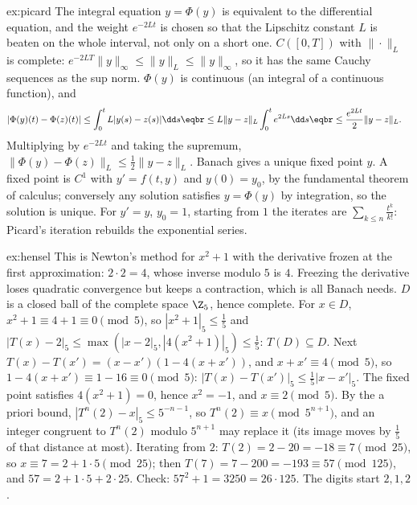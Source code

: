 \begin{solution}{ex:picard}
\idea The integral equation $y=\Phi(y)$ is equivalent to the differential equation, and the weight $e^{-2Lt}$ is chosen so that the
Lipschitz constant $L$ is beaten on the whole interval, not only on a short one.
\writeup $C([0,T])$ with $\|\cdot\|_L$ is complete: $e^{-2LT}\|y\|_\infty\le\|y\|_L\le\|y\|_\infty$, so it has the same Cauchy sequences as the sup norm. $\Phi(y)$ is
continuous (an integral of a continuous function), and
\[
\begin{aligned}|\Phi(y)(t)-\Phi(z)(t)|&\le\int_0^tL|y(s)-z(s)|\dd s\eqbr\le L\|y-z\|_L\int_0^te^{2Ls}\dd s\eqbr\le\frac{e^{2Lt}}2\|y-z\|_L.\end{aligned}
\]
Multiplying by $e^{-2Lt}$ and taking the supremum, $\|\Phi(y)-\Phi(z)\|_L\le\frac12\|y-z\|_L$. Banach gives a unique fixed point $y$. A fixed point is $C^1$ with
$y'=f(t,y)$ and $y(0)=y_0$, by the fundamental theorem of calculus; conversely any solution satisfies $y=\Phi(y)$ by integration, so the
solution is unique. For $y'=y$, $y_0=1$, starting from $1$ the iterates are $\sum_{k\le n}\frac{t^k}{k!}$: Picard's iteration rebuilds the exponential
series.
\end{solution}

\begin{solution}{ex:hensel}
\idea This is Newton's method for $x^2+1$ with the derivative frozen at the first approximation: $2\cdot2=4$, whose inverse modulo $5$ is $4$.
Freezing the derivative loses quadratic convergence but keeps a contraction, which is all Banach needs.
\writeup $D$ is a closed ball of the complete space $\Z_5$, hence complete. For $x\in D$, $x^2+1\equiv4+1\equiv0\pmod5$, so $|x^2+1|_5\le\frac15$ and $|T(x)-2|_5\le\max(|x-2|_5,|4(x^2+1)|_5)\le\frac15$:
$T(D)\subseteq D$. Next $T(x)-T(x')=(x-x')(1-4(x+x'))$, and $x+x'\equiv4\pmod5$, so $1-4(x+x')\equiv1-16\equiv0\pmod5$: $|T(x)-T(x')|_5\le\frac15|x-x'|_5$. The fixed point
satisfies $4(x^2+1)=0$, hence $x^2=-1$, and $x\equiv2\pmod5$. By the a priori bound, $|T^n(2)-x|_5\le5^{-n-1}$, so $T^n(2)\equiv x\pmod{5^{n+1}}$, and an integer congruent to $T^n(2)$ modulo $5^{n+1}$ may replace it
(its image moves by $\frac15$ of that distance at most). Iterating from $2$: $T(2)=2-20=-18\equiv7\pmod{25}$, so $x\equiv7=2+1\cdot5\pmod{25}$; then
$T(7)=7-200=-193\equiv57\pmod{125}$, and $57=2+1\cdot5+2\cdot25$. Check: $57^2+1=3250=26\cdot125$. The digits start $2,1,2$.
\end{solution}

